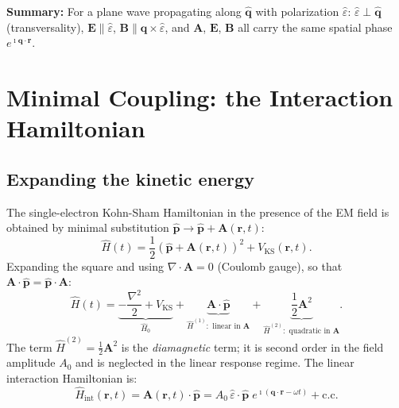 \documentclass[11pt]{article}
\newcommand{\iunit}{\imath}          %
\newcommand{\Avec}{\mathbf{A}}
\newcommand{\Evec}{\mathbf{E}}
\newcommand{\Bvec}{\mathbf{B}}
\newcommand{\phat}{\hat{\mathbf{p}}}
\begin{document}
\begin{keyresult}
\textbf{Summary:} For a plane wave propagating along $\hat{\mathbf{q}}$
with polarization $\hat{\varepsilon}$:
$\hat{\varepsilon}\perp\hat{\mathbf{q}}$ (transversality),
$\Evec\parallel\hat{\varepsilon}$,
$\Bvec\parallel\mathbf{q}\times\hat{\varepsilon}$,
and $\Avec$, $\Evec$, $\Bvec$ all carry the same spatial phase
$e^{\iunit\mathbf{q}\cdot\mathbf{r}}$.
\end{keyresult}

\section{Minimal Coupling: the Interaction Hamiltonian}

\subsection{Expanding the kinetic energy}

The single-electron Kohn-Sham Hamiltonian in the presence of the
EM field is obtained by minimal substitution
$\phat\to\phat+\Avec(\mathbf{r},t)$:
\begin{equation}
  \hat{H}(t)
  = \frac{1}{2}
    \!\left(\phat+\Avec(\mathbf{r},t)\right)^{\!2}
    + V_\mathrm{KS}(\mathbf{r},t).
  \label{eq:H-full}
\end{equation}
Expanding the square and using $\nabla\cdot\Avec=0$ (Coulomb gauge),
so that $\Avec\cdot\phat = \phat\cdot\Avec$:
\begin{equation}
  \hat{H}(t)
  = \underbrace{-\frac{\nabla^2}{2} + V_\mathrm{KS}}_{\hat{H}_0}
  + \underbrace{\Avec\cdot\phat}_{\hat{H}^{(1)}: \text{ linear in }\Avec}
  + \underbrace{\frac{1}{2}\Avec^2}_{\hat{H}^{(2)}: \text{ quadratic in }\Avec}.
  \label{eq:H-expand}
\end{equation}
The term $\hat{H}^{(2)} = \frac{1}{2}\Avec^2$ is the
\emph{diamagnetic} term; it is second order in the field amplitude
$A_0$ and is neglected in the linear response regime.
The linear interaction Hamiltonian is:
\begin{equation}
  \hat{H}_\mathrm{int}(\mathbf{r},t)
  = \Avec(\mathbf{r},t)\cdot\phat
  = A_0\,\hat{\varepsilon}\cdot\phat\;
    e^{\iunit(\mathbf{q}\cdot\mathbf{r}-\omega t)}
    + \text{c.c.}
  \label{eq:Hint-exact}
\end{equation}

\end{document}
